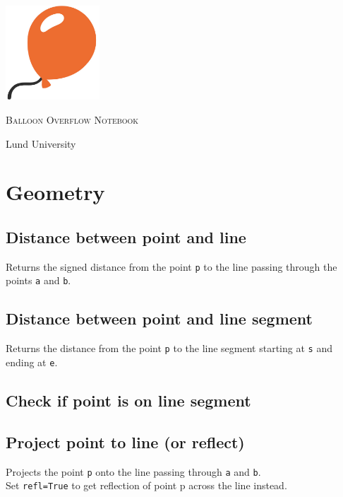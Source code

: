 \documentclass{article}
\begin{document}
\begin{titlepage}
  \centering
  \vspace*{\fill}
  \includegraphics[width=100pt]{balloon.jpg}\\
  \vspace{0.5cm}
  {\scshape\Huge Balloon Overflow Notebook \par}
  \vspace{1cm}
  {\LARGE\color{black!75} Lund University \par}
  \vspace*{\fill}
\end{titlepage}

\section*{Geometry}



\subsection*{Distance between point and line}
Returns the signed distance from the point \texttt{p} to the line passing through the points \texttt{a} and \texttt{b}.


\subsection*{Distance between point and line segment}
Returns the distance from the point \texttt{p} to the line segment starting at \texttt{s} and ending at \texttt{e}.


\subsection*{Check if point is on line segment}


\subsection*{Project point to line (or reflect)}
Projects the point \texttt{p} onto the line passing through \texttt{a} and \texttt{b}.\\
Set \texttt{refl=True} to get reflection of point p across the line instead.

\end{document}
